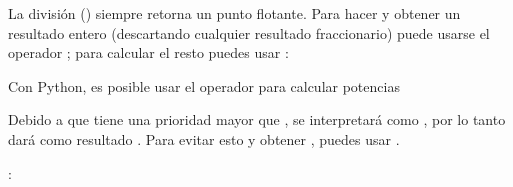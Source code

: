 \documentclass[a5paper,10pt,spanish]{sphinxmanual}
\begin{document}
\sphinxAtStartPar
La división (\sphinxcode{\sphinxupquote{/}}) siempre retorna un punto flotante. Para hacer {\hyperref[\detokenize{glossary:term-floor-division}]{}} y obtener un resultado entero (descartando cualquier resultado fraccionario) puede usarse el operador \sphinxcode{\sphinxupquote{//}}; para calcular el resto puedes usar \sphinxcode{\sphinxupquote{\%}}:

\begin{sphinxVerbatim}[commandchars=\\\{\}]
    
    
    
      
\end{sphinxVerbatim}

\sphinxAtStartPar
Con Python, es posible usar el operador \sphinxcode{\sphinxupquote{**}} para calcular potencias %
\begin{footnote}[1]\sphinxAtStartFootnote
Debido a que \sphinxcode{\sphinxupquote{**}} tiene una prioridad mayor que ,  se interpretará como , por lo tanto dará como resultado . Para evitar esto y obtener , puedes usar .
%
\end{footnote}:

\begin{sphinxVerbatim}[commandchars=\\\{\}]
    
    
\end{sphinxVerbatim}
\end{document}
